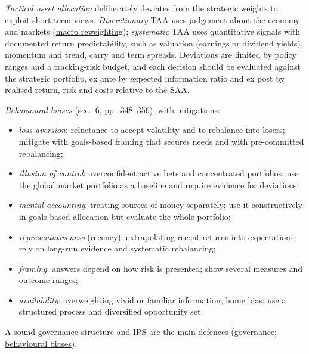 \begin{qfmethod}\label{meth:tactical-shifts-behavioural-biases}
 \emph{Tactical asset allocation} \citep[chap.~7, sec.~5, pp.~343--348]{portfolio-management-in-practice-v1-2020} deliberately deviates from the strategic weights to exploit short-term views. \emph{Discretionary} TAA uses judgement about the economy and markets (\hyperref[ex:global-portfolio-macro-rebalancing]{macro reweighting}); \emph{systematic} TAA uses quantitative signals with documented return predictability, such as valuation (earnings or dividend yields), momentum and trend, carry and term spreads. Deviations are limited by policy ranges and a tracking-risk budget, and each decision should be evaluated against the strategic portfolio, ex ante by expected information ratio and ex post by realised return, risk and costs relative to the SAA.

\emph{Behavioural biases} (sec.~6, pp.~348--356), with mitigations:
\begin{itemize}
\item \emph{loss aversion}: reluctance to accept volatility and to rebalance into losers; mitigate with goals-based framing that secures needs and with pre-committed rebalancing;
\item \emph{illusion of control}: overconfident active bets and concentrated portfolios; use the global market portfolio as a baseline and require evidence for deviations;
\item \emph{mental accounting}: treating sources of money separately; use it constructively in goals-based allocation but evaluate the whole portfolio;
\item \emph{representativeness} (recency): extrapolating recent returns into expectations; rely on long-run evidence and systematic rebalancing;
\item \emph{framing}: answers depend on how risk is presented; show several measures and outcome ranges;
\item \emph{availability}: overweighting vivid or familiar information, home bias; use a structured process and diversified opportunity set.
\end{itemize}
A sound governance structure and IPS are the main defences (\hyperref[def:investment-governance-allocation]{governance}; \hyperref[def:behavioural-biases]{behavioural biases}).


\end{qfmethod}
